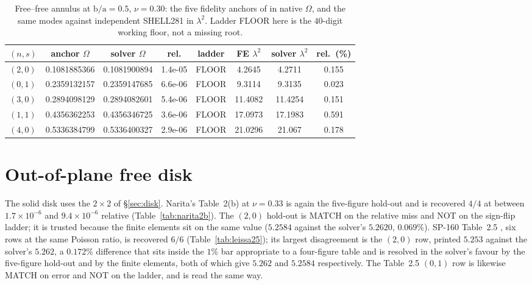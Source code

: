 \documentclass[11pt]{article}
\newcommand{\lamsq}{\lambda^{2}}
\newcommand{\ba}{\mbox{b/a}}
\begin{document}
\begin{table}[htbp]\centering\small
\caption{Free--free annulus at $\ba=0.5$, $\nu=0.30$: the five fidelity
anchors of \cite{mccune2026annular} in native $\Omega$, and the same modes
against independent SHELL281 \cite{ansys} in $\lamsq$. Ladder FLOOR here is
the $40$-digit working floor, not a missing root.}
\label{tab:five}
\begin{tabular}{lccccccc}
\toprule
$(n,s)$ & anchor $\Omega$ & solver $\Omega$ & rel. & ladder
& FE $\lamsq$ & solver $\lamsq$ & rel.\ (\%)\\
\midrule
$(2,0)$ & 0.1081885366 & 0.1081900894 & 1.4e-05 & FLOOR & 4.2645 & 4.2711 & 0.155 \\
$(0,1)$ & 0.2359132157 & 0.2359147685 & 6.6e-06 & FLOOR & 9.3114 & 9.3135 & 0.023 \\
$(3,0)$ & 0.2894098129 & 0.2894082601 & 5.4e-06 & FLOOR & 11.4082 & 11.4254 & 0.151 \\
$(1,1)$ & 0.4356362253 & 0.4356346725 & 3.6e-06 & FLOOR & 17.0973 & 17.1983 & 0.591 \\
$(4,0)$ & 0.5336384799 & 0.5336400327 & 2.9e-06 & FLOOR & 21.0296 & 21.067 & 0.178 \\
\bottomrule
\end{tabular}
\end{table}

\FloatBarrier
\section{Out-of-plane free disk}\label{sec:disk-results}
The solid disk uses the $2\times2$ of \S\ref{sec:disk}. Narita's Table~2(b)
\cite{narita1984} at $\nu=0.33$ is again the five-figure hold-out and is
recovered $4/4$ at between $1.7\times10^{-6}$ and $9.4\times10^{-6}$ relative
(Table~\ref{tab:narita2b}). The $(2,0)$ hold-out is MATCH on the relative miss
and NOT on the sign-flip ladder; it is trusted because the finite elements sit
on the same value ($5.2584$ against the solver's $5.2620$, $0.069\%$). SP-160
Table~2.5 \cite{leissaSP160}, six rows at the same Poisson ratio, is recovered
$6/6$ (Table~\ref{tab:leissa25}); its largest disagreement is the
$(2,0)$ row, printed $5.253$ against the solver's $5.262$, a $0.172\%$
difference that sits inside the $1\%$ bar appropriate to a four-figure table
and is resolved in the solver's favour by the five-figure hold-out and by the
finite elements, both of which give $5.262$ and $5.2584$ respectively. The
Table~2.5 $(0,1)$ row is likewise MATCH on error and NOT on the ladder, and is
read the same way.
\end{document}
